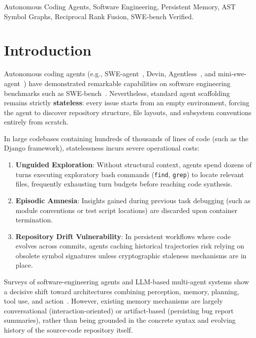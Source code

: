 \documentclass[conference]{IEEEtran}
\begin{document}
\begin{IEEEkeywords}
Autonomous Coding Agents, Software Engineering, Persistent Memory, AST Symbol Graphs, Reciprocal Rank Fusion, SWE-bench Verified.
\end{IEEEkeywords}

\section{Introduction}
Autonomous coding agents (e.g., SWE-agent~\cite{yang2024sweagent}, Devin, Agentless~\cite{xia2024agentless}, and mini-swe-agent~\cite{lieret2025minisweagent}) have demonstrated remarkable capabilities on software engineering benchmarks such as SWE-bench~\cite{jimenez2024swebench}. Nevertheless, standard agent scaffolding remains strictly \textbf{stateless}: every issue starts from an empty environment, forcing the agent to discover repository structure, file layouts, and subsystem conventions entirely from scratch.

In large codebases containing hundreds of thousands of lines of code (such as the Django framework), statelessness incurs severe operational costs:
\begin{enumerate}
    \item \textbf{Unguided Exploration}: Without structural context, agents spend dozens of turns executing exploratory bash commands (\texttt{find}, \texttt{grep}) to locate relevant files, frequently exhausting turn budgets before reaching code synthesis.
    \item \textbf{Episodic Amnesia}: Insights gained during previous task debugging (such as module conventions or test script locations) are discarded upon container termination.
    \item \textbf{Repository Drift Vulnerability}: In persistent workflows where code evolves across commits, agents caching historical trajectories risk relying on obsolete symbol signatures unless cryptographic staleness mechanisms are in place.
\end{enumerate}

Surveys of software-engineering agents and LLM-based multi-agent systems show a decisive shift toward architectures combining perception, memory, planning, tool use, and action~\cite{wang2025agents, he2025multiagent}. However, existing memory mechanisms are largely conversational (interaction-oriented) or artifact-based (persisting bug report summaries), rather than being grounded in the concrete syntax and evolving history of the source-code repository itself.
\end{document}
